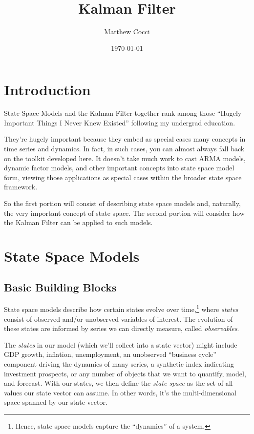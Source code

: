 \documentclass[a4paper,12pt]{article}
\author{Matthew Cocci}
\title{Kalman Filter}
\date{\today}
\begin{document}
\maketitle


\section{Introduction}

State Space Models and the Kalman Filter together rank among those ``Hugely Important Things I Never Knew Existed'' following my undergrad education. 

They're hugely important because they embed as special cases many concepts in time series and dynamics. In fact, in such cases, you can almost always fall back on the toolkit developed here. It doesn't take much work to cast ARMA models, dynamic factor models, and other important concepts into state space model form, viewing those applications as special cases within the broader state space framework.

So the first portion will consist of describing state space models and, naturally, the very important concept of state space. The second portion will consider how the Kalman Filter can be applied to such models.

\section{State Space Models}

\subsection{Basic Building Blocks}

State space models describe how certain states evolve over time,\footnote{Hence, state space models capture the ``dynamics'' of a system.} where \emph{states} consist of observed and/or unobserved variables of interest. The evolution of these states are informed by series we can directly measure, called \emph{observables}.

The \emph{states} in our model (which we'll collect into a state vector) might include GDP growth, inflation, unemployment, an unobserved ``business cycle'' component driving the dynamics of many series, a synthetic index indicating investment prospects, or any number of objects that we want to quantify, model, and forecast. With our states, we then define the \emph{state space} as the set of all values our state vector can assume. In other words, it's the multi-dimensional space spanned by our state vector. 
\end{document}
